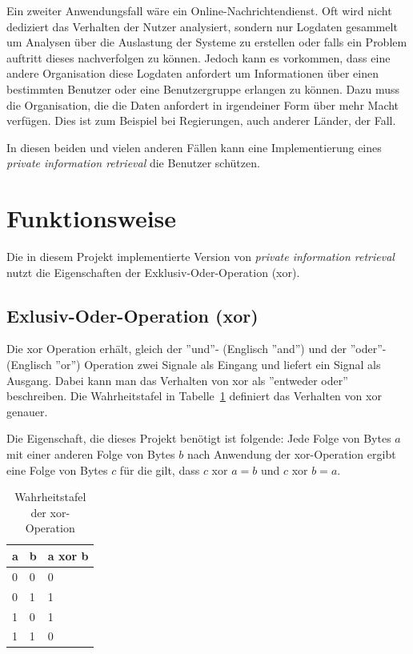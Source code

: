 \documentclass[]{article}
\begin{document}
Ein zweiter Anwendungsfall wäre ein Online-Nachrichtendienst. Oft wird nicht dediziert das Verhalten der Nutzer analysiert, sondern nur Logdaten gesammelt um Analysen über die Auslastung der Systeme zu erstellen oder falls ein Problem auftritt dieses nachverfolgen zu können. Jedoch kann es vorkommen, dass eine andere Organisation diese Logdaten anfordert um Informationen über einen bestimmten Benutzer oder eine Benutzergruppe erlangen zu können. Dazu muss die Organisation, die die Daten anfordert in irgendeiner Form über mehr Macht verfügen. Dies ist zum Beispiel bei Regierungen, auch anderer Länder, der Fall.

In diesen beiden und vielen anderen Fällen kann eine Implementierung eines \textit{private information retrieval} die Benutzer schützen.

\section{Funktionsweise}
Die in diesem Projekt implementierte Version von \textit{private information retrieval} nutzt die Eigenschaften der Exklusiv-Oder-Operation (xor).

\subsection{Exlusiv-Oder-Operation (xor)}
Die xor Operation erhält, gleich der ''und''- (Englisch ''and'') und der ''oder''- (Englisch ''or'') Operation zwei Signale als Eingang und liefert ein Signal als Ausgang. Dabei kann man das Verhalten von xor als ''entweder oder'' beschreiben. Die Wahrheitstafel in Tabelle~\ref{tab:wahrheitstafel_xor} definiert das Verhalten von xor genauer.

Die Eigenschaft, die dieses Projekt benötigt ist folgende: Jede Folge von Bytes $a$ mit einer anderen Folge von Bytes $b$ nach Anwendung der xor-Operation ergibt eine Folge von Bytes $c$ für die gilt, dass $c$ xor $a = b$ und $c$ xor $b = a$.

\begin{table}[]
	\centering
	\begin{tabular}{|l|l|l|}
		\hline
		\textbf{a} & \textbf{b} & \textbf{a xor b} \\ \hline
		0          & 0          & 0                \\ \hline
		0          & 1          & 1                \\ \hline
		1          & 0          & 1                \\ \hline
		1          & 1          & 0                \\ \hline
	\end{tabular}
	\caption{Wahrheitstafel der xor-Operation}
	\label{tab:wahrheitstafel_xor}
\end{table}
\end{document}
